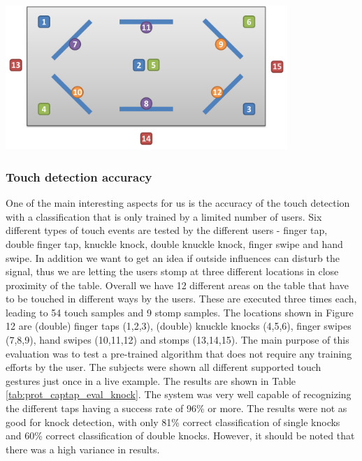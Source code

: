 \begin{minipage}{\linewidth}
\centering
\includegraphics[width=0.8\textwidth]{images/eval_touch_v2}
\label{fig:eval_touch_v2}
\end{minipage}

\subsubsection*{Touch detection accuracy}
One of the main interesting aspects for us is the accuracy of the touch detection with a classification that is only trained by a limited number of users. Six different types of touch events are tested by the different users - finger tap, double finger tap, knuckle knock, double knuckle knock, finger swipe and hand swipe. In addition we want to get an idea if outside influences can disturb the signal, thus we are letting the users stomp at three different locations in close proximity of the table. Overall we have 12 different areas on the table that have to be touched in different ways by the users. These are executed three times each, leading to 54 touch samples and 9 stomp samples. The locations shown in Figure 12  are (double) finger taps (1,2,3), (double) knuckle knocks (4,5,6), finger swipes (7,8,9), hand swipes (10,11,12) and  stomps (13,14,15). The main purpose of this evaluation was to test a pre-trained algorithm that does not require any training efforts by the user. The subjects were shown all different supported touch gestures just once in a live example. The results are shown in Table \ref{tab:prot_captap_eval_knock}. The system was very well capable of recognizing the different taps having a success rate of 96\% or more. The results were not as good for knock detection, with only 81\% correct classification of single knocks and 60\% correct classification of double knocks. However, it should be noted that there was a high variance in results.
 
